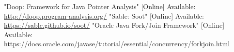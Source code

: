 \documentclass{dithesis}
\begin{document}
\begin{thesisbibliography}[REFERENCES]{99}
		"Doop: Framework for Java Pointer Analysis"
		[Online]
		Available: \url{http://doop.program-analysis.org/}
		"Sable: Soot"
		[Online]
		Available: \url{https://sable.github.io/soot/}
		"Oracle Java Fork/Join Framework"
		[Online]
		Available: \url{https://docs.oracle.com/javase/tutorial/essential/concurrency/forkjoin.html}
\end{thesisbibliography}
\end{document}
